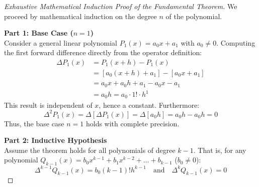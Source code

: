 \begin{proof}[Exhaustive Mathematical Induction Proof of the Fundamental Theorem]
We proceed by mathematical induction on the degree $n$ of the polynomial.

\medskip
\noindent\textbf{Part 1: Base Case ($n = 1$)} \\
Consider a general linear polynomial $P_1(x) = a_0 x + a_1$ with $a_0 \ne 0$.
Computing the first forward difference directly from the operator definition:
\begin{align}
    \Delta P_1(x) &= P_1(x + h) - P_1(x) \nonumber \\
    &= [a_0(x + h) + a_1] - [a_0 x + a_1] \nonumber \\
    &= a_0 x + a_0 h + a_1 - a_0 x - a_1 \nonumber \\
    &= a_0 h = a_0 \cdot 1! \cdot h^1
\end{align}
This result is independent of $x$, hence a constant. Furthermore:
\begin{equation}
    \Delta^2 P_1(x) = \Delta[\Delta P_1(x)] = \Delta[a_0 h] = a_0 h - a_0 h = 0
\end{equation}
Thus, the base case $n = 1$ holds with complete precision.

\medskip
\noindent\textbf{Part 2: Inductive Hypothesis} \\
Assume the theorem holds for all polynomials of degree $k - 1$. That is, for any polynomial $Q_{k-1}(x) = b_0 x^{k-1} + b_1 x^{k-2} + \dots + b_{k-1}$ ($b_0 \ne 0$):
\begin{equation}
    \Delta^{k-1} Q_{k-1}(x) = b_0 (k - 1)! h^{k-1} \quad \text{and} \quad \Delta^k Q_{k-1}(x) = 0
\end{equation}


\end{proof}
